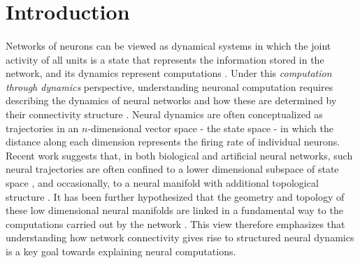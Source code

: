 \section*{Introduction}
\paragraph{}
Networks of neurons can be viewed as dynamical systems in which the joint activity of all units is a state that
represents the information stored in the network, and its dynamics represent computations .
Under this \textit{computation through dynamics} perspective, understanding neuronal computation requires describing the
dynamics of neural networks and how these are determined by their connectivity structure . Neural dynamics are often conceptualized as trajectories in an $n$-dimensional vector space - the
state space - in which the distance along each dimension represents the firing rate of individual neurons.
Recent work suggests that, in both biological and artificial neural networks, such neural trajectories are often
confined to a lower dimensional subspace of state space , and occasionally, to a neural manifold with additional topological
structure .
It has been further hypothesized that the geometry and topology of these low dimensional neural manifolds are linked in
a fundamental way to the computations carried out by the network .
This view therefore emphasizes that understanding how network connectivity gives rise to structured neural dynamics is a
key goal towards explaining neural computations.

